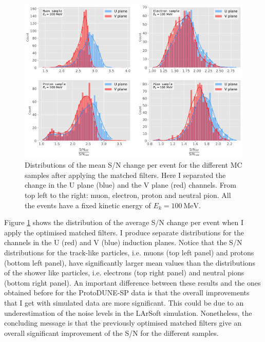 \begin{figure}[t]
	\centering
	\includegraphics[width=0.9\linewidth]{Images/Matched_Filter/larsoft_sn_hists.pdf}
	\caption[Distributions of the mean S/N change per event for the different MC samples after applying the matched filters.]{Distributions of the mean S/N change per event for the different MC samples after applying the matched filters. Here I separated the change in the U plane (blue) and the V plane (red) channels. From top left to the right: muon, electron, proton and neutral pion. All the events have a fixed kinetic energy of $E_{k} = 100 \ \mathrm{MeV}$.}
	\label{fig:mono_summary_hist}
\end{figure}

Figure \ref{fig:mono_summary_hist} shows the distribution of the average S/N change per event when I apply the optimised matched filters. I produce separate distributions for the channels in the U (red) and V (blue) induction planes. Notice that the S/N distributions for the track-like particles, i.e. muons (top left panel) and protons (bottom left panel), have significantly larger mean values than the distributions of the shower like particles, i.e. electrons (top right panel) and neutral pions (bottom right panel). An important difference between these results and the ones obtained before for the ProtoDUNE-SP data is that the overall improvements that I get with simulated data are more significant. This could be due to an underestimation of the noise levels in the LArSoft simulation. Nonetheless, the concluding message is that the previously optimised matched filters give an overall significant improvement of the S/N for the different samples.

